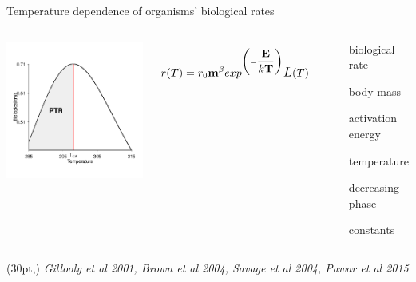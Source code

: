 \documentclass[11pt, compress, aspectratio=1610]{beamer}
\newcommand\smallcitation[1]{%
\begin{textblock*}{\textwidth}(30pt,\textheight)
    \raggedleft \small\textit{#1}
\end{textblock*}}
\providecommand{\tightlist}{%
  \setlength{\itemsep}{0pt}\setlength{\parskip}{0pt}}
\newcommand{\begincols}{\begin{columns}}
\newcommand{\stopcols}{\end{columns}}
\begin{document}
\begin{frame}{Temperature dependence of organisms' biological rates}

\begincols
{} \centering
\includegraphics[width=1\linewidth]{figuresAz/MTE.pdf}

\hfill{}

\[
    r(T)= r_0 \textbf{m}^{\beta} exp^{\biggl(-\dfrac{\textbf{E}}{k\textbf{T}}\biggr)}\mathlarger{L}(T)
\]

~

\begin{description}
\tightlist
\item[\(r(T)\)]
biological rate
\item[\(m\)]
body-mass
\item[\(E\)]
activation energy
\item[\(T\)]
temperature
\item[\(L(T)\)]
decreasing phase
\item[\(\beta\), \(r_0\), \(k\)]
constants
\end{description}

\stopcols
\smallcitation{Gillooly et al 2001, Brown et al 2004, Savage et al 2004, Pawar et al 2015}

\end{frame}
\end{document}

